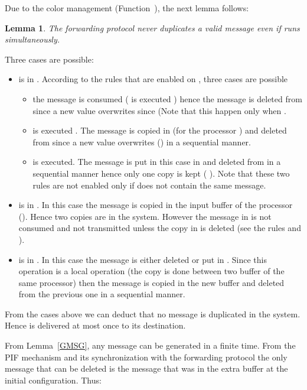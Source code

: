 \documentclass{llncs}
\renewenvironment{proof}{{\it Proof. } }{{\hfill }\vspace{.5pc}}
\newtheorem{lem}{Lemma}
\begin{document}
Due to the color management (Function~), the next lemma follows:

\begin{lem}\label{lem:duplicate}
The forwarding protocol never duplicates a valid message even if  runs simultaneously.
\end{lem}

\begin{proof}
Three cases are possible:
\begin{itemize}
\item{ is in . According to the rules that are enabled on , three cases are possible \\ } 
\begin{itemize}
\item{the message is consumed ( is executed ) hence the message  is deleted from  since a new value overwrites since  (Note that this happen only when .}
\item{ is executed . The message is copied in  (for the processor ) and deleted from  since a new value overwrites () in a sequential manner.}
\item{ is executed. The message is put in this case in  and deleted from  in a sequential manner hence only one copy is kept (  ). Note that these two rules are not enabled only if  does not contain the same message.}
\end{itemize}
\item{ is in . In this case the message  is copied in the input buffer of the processor  (). Hence two copies are in the system. However the message in  is not consumed and not transmitted unless the copy in  is deleted (see the rules  and ). } 
\item{ is in . In this case the message is either deleted or put in . Since this operation is a local operation (the copy is done between two buffer of the same processor) then the message is copied in the new buffer and deleted from the previous one in a sequential manner.}
\end{itemize}

From the cases above we can deduct that no message is duplicated in the system. Hence  is delivered at most once to its destination.
\end{proof}




 From Lemma~\ref{GMSG}, any message can be generated in a finite time.  
 From the PIF mechanism and its synchronization with the forwarding protocol the only message that can be deleted is
the message that was in the extra buffer at the initial configuration.  Thus:
\end{document}
